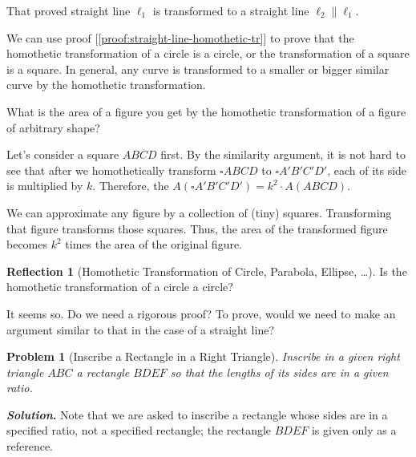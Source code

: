 \documentclass[11pt]{article}
\theoremstyle{definition}
\theoremstyle{plain}
\theoremstyle{problemstyle}
\newtheorem{problem}{Problem}
\theoremstyle{remark}
\theoremstyle{definition}
\newtheorem{reflection}{Reflection}
\begin{document}
That proved straight line $\ell_1$ is transformed to a straight line $\ell_2\parallel\ell_1$.

We can use proof [\ref{proof:straight-line-homothetic-tr}] to prove that the homothetic transformation of a circle is a circle, or the transformation of a square is a square. In general, any curve is transformed to a smaller or bigger similar curve by the homothetic transformation.

What is the area of a figure you get by the homothetic transformation of a figure of arbitrary shape?

Let's consider a square $ABCD$ first. By the similarity argument, it is not hard to see that after we homothetically transform $\square ABCD$ to $\square A'B'C'D'$, each of its side is multiplied by $k$. Therefore, the $A(\square A'B'C'D')=k^2\cdot A(ABCD)$.

We can approximate any figure by a collection of (tiny) squares. Transforming that figure transforms those squares. Thus, the area of the transformed figure becomes $k^2$ times the area of the original figure.

\begin{reflection}[Homothetic Transformation of Circle, Parabola, Ellipse, \dots]
    Is the homothetic transformation of a circle a circle?

    It seems so. Do we need a rigorous proof? To prove, would we need to make an argument similar to that in the case of a straight line?
\end{reflection}

\begin{problem}[Inscribe a Rectangle in a Right Triangle]\label{pr:inscribe-rect-in-right-tr}
    Inscribe in a given right triangle $ABC$ a rectangle $BDEF$ so that the lengths of its sides are in a given ratio.
\end{problem}

\textbf{\emph{Solution}.} Note that we are asked to inscribe a rectangle whose sides are in a specified ratio, not a specified rectangle; the rectangle $BDEF$ is given only as a reference.
\end{document}
